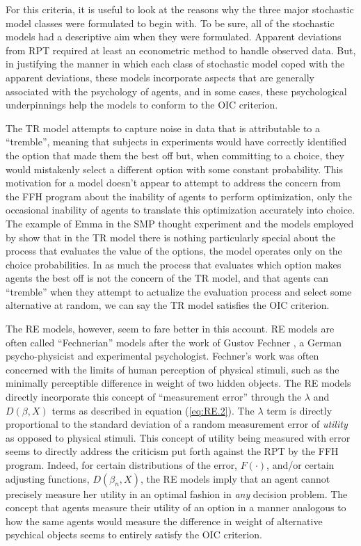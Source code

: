 \documentclass[11pt,a4paper]{article}
\begin{document}
For this criteria, it is useful to look at the reasons why the three major stochastic model classes were formulated to begin with.
To be sure, all of the stochastic models had a descriptive aim when they were formulated.
Apparent deviations from RPT required at least an econometric method to handle observed data.
But, in justifying the manner in which each class of stochastic model coped with the apparent deviations, these models incorporate aspects that are generally associated with the psychology of agents, and in some cases, these psychological underpinnings help the models to conform to the OIC criterion.

The TR model attempts to capture noise in data that is attributable to a \enquote{tremble}, meaning that subjects in experiments would have correctly identified the option that made them the best off but, when committing to a choice, they would mistakenly select a different option with some constant probability.
This motivation for a model doesn't appear to attempt to address the concern from the FFH program about the inability of agents to perform optimization, only the occasional inability of agents to translate this optimization accurately into choice.
The example of Emma in the SMP thought experiment and the models employed by \textcite{Loomes2002} show that in the TR model there is nothing particularly special about the process that evaluates the value of the options, the model operates only on the choice probabilities.
In as much the process that evaluates which option makes agents the best off is not the concern of the TR model, and that agents can \enquote{tremble} when they attempt to actualize the evaluation process and select some alternative at random, we can say the TR model satisfies the OIC criterion.

The RE models, however, seem to fare better in this account.
RE models are often called \enquote{Fechnerian} models after the work of Gustov Fechner \parencite{Fechner1966a}, a German psycho-physicist and experimental psychologist.
Fechner's work was often concerned with the limits of human perception of physical stimuli, such as the minimally perceptible difference in weight of two hidden objects.
The RE models directly incorporate this concept of \enquote{measurement error} through the $\lambda$ and $D(\beta,X)$ terms as described in equation (\ref{eq:RE.2}).
The $\lambda$ term is directly proportional to the standard deviation of a random measurement error of \textit{utility} as opposed to physical stimuli.
This concept of utility being measured with error seems to directly address the criticism put forth against the RPT by the FFH program.
Indeed, for certain distributions of the error, $F(\cdot)$, and/or certain adjusting functions, $D(\beta_n,X)$, the RE models imply that an agent cannot precisely measure her utility in an optimal fashion in \textit{any} decision problem.
The concept that agents measure their utility of an option in a manner analogous to how the same agents would measure the difference in weight of alternative psychical objects seems to entirely satisfy the OIC criterion.
\end{document}
